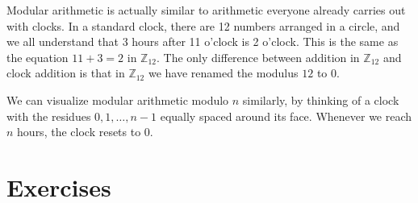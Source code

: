 \documentclass[11pt]{article}
\theoremstyle{definition}
\newcommand{\Z}{\mathbb{Z}} %
\begin{document}
Modular arithmetic is actually similar to
arithmetic everyone already carries out with clocks. In a standard
clock, there are 12 numbers arranged in a circle, and we all
understand that 3 hours after 11 o'clock is 2 o'clock. This is the
same as the equation $11+3 = 2$ in $\Z_{12}$. The only difference
between addition in $\Z_{12}$ and clock addition is that in $\Z_{12}$
we have renamed the modulus $12$ to $0$.

We can visualize modular arithmetic modulo $n$ similarly, by thinking
of a clock with the residues $0, 1, \dots, n-1$ equally spaced around
its face. Whenever we reach $n$ hours, the clock resets to $0$. 




\section*{Exercises}
\end{document}
